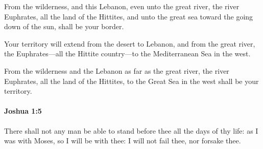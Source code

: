 			\begin{versebox}
					\item[BHS] 
					\item[ASV] From the wilderness, and this Lebanon, even unto the great river, the river Euphrates, all the land of the Hittites, and unto the great sea toward the going down of the sun, shall be your border.
					\item[NIV] Your territory will extend from the desert to Lebanon, and from the great river, the Euphrates—all the Hittite country—to the Mediterranean Sea in the west.
					\item[NRSV] From the wilderness and the Lebanon as far as the great river, the river Euphrates, all the land of the Hittites, to the Great Sea in the west shall be your territory.
			\end{versebox}

		\paragraph{Joshua 1:5} %
			\label{JOSHUA-1-5}

			There shall not any man be able to stand before thee all the days of thy life: as I was with Moses, so I will be with thee: I will not fail thee, nor forsake thee.

